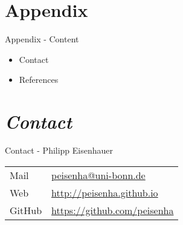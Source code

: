 
\appendix
\section{Appendix}
\begin{frame}{Appendix - Content}
\begin{itemize}\setlength\itemsep{1em}
\thispagestyle{empty}
\item Contact
\item References
\end{itemize}
\end{frame}
\section{\textit{Contact}}
\begin{frame}{Contact - Philipp Eisenhauer}
	\thispagestyle{empty}
\vspace{2cm}
	\begin{tabular}{ll}
		Mail		    & \href{mailto:peisenha@uni-bonn.de}{peisenha@uni-bonn.de}\\
		Web     	  & \url{http://peisenha.github.io} \\
		GitHub      & \url{https://github.com/peisenha}\\
	\end{tabular}


\end{frame}
